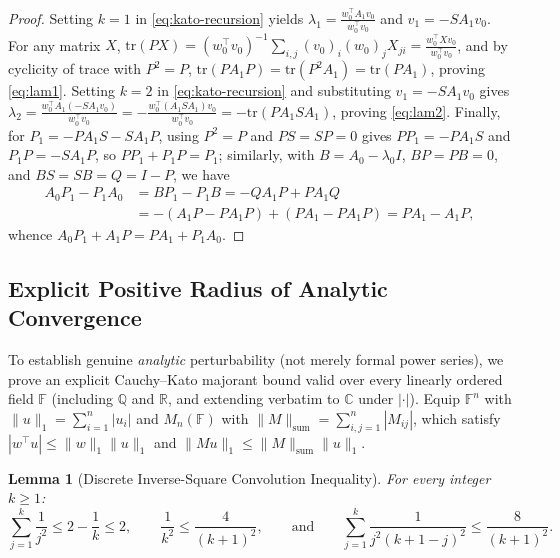 \documentclass[11pt,a4paper]{article}
\newtheorem{lemma}[theorem]{Lemma}
\theoremstyle{definition}
\newcommand{\tr}{\mathrm{tr}}
\begin{document}
\begin{proof}
Setting $k = 1$ in \eqref{eq:kato-recursion} yields $\lambda_1 =
\frac{w_0^\top A_1 v_0}{w_0^\top v_0}$ and $v_1 = - S A_1 v_0$. For any matrix $X$,
$\tr(P X) = (w_0^\top v_0)^{-1} \sum_{i,j} (v_0)_i (w_0)_j X_{ji} =
\frac{w_0^\top X v_0}{w_0^\top v_0}$, and by cyclicity of trace with $P^2 = P$,
$\tr(P A_1 P) = \tr(P^2 A_1) = \tr(P A_1)$, proving \eqref{eq:lam1}. Setting $k = 2$ in
\eqref{eq:kato-recursion} and substituting $v_1 = - S A_1 v_0$ gives
$\lambda_2 = \frac{w_0^\top A_1 (- S A_1 v_0)}{w_0^\top v_0} =
-\frac{w_0^\top (A_1 S A_1) v_0}{w_0^\top v_0} = -\tr(P A_1 S A_1)$, proving
\eqref{eq:lam2}. Finally, for $P_1 = - P A_1 S - S A_1 P$, using $P^2 = P$ and
$P S = S P = 0$ gives $P P_1 = - P A_1 S$ and $P_1 P = - S A_1 P$, so $P P_1 + P_1 P =
P_1$; similarly, with $B = A_0 - \lambda_0 I$, $B P = P B = 0$, and $B S = S B = Q =
I - P$, we have
\begin{align*}
  A_0 P_1 - P_1 A_0 &= B P_1 - P_1 B = - Q A_1 P + P A_1 Q \\
  &= -(A_1 P - P A_1 P) + (P A_1 - P A_1 P) = P A_1 - A_1 P,
\end{align*}
whence $A_0 P_1 + A_1 P = P A_1 + P_1 A_0$.
\end{proof}

\subsection{Explicit Positive Radius of Analytic Convergence}

To establish genuine \emph{analytic} perturbability (not merely formal power series), we
prove an explicit Cauchy--Kato majorant bound valid over every linearly ordered field
$\mathbb{F}$ (including $\mathbb{Q}$ and $\mathbb{R}$, and extending verbatim to
$\mathbb{C}$ under $|\cdot|$). Equip $\mathbb{F}^n$ with $\|u\|_1 = \sum_{i=1}^n |u_i|$
and $M_n(\mathbb{F})$ with $\|M\|_{\mathrm{sum}} = \sum_{i,j=1}^n |M_{ij}|$, which
satisfy $|w^\top u| \le \|w\|_1 \|u\|_1$ and $\|M u\|_1 \le \|M\|_{\mathrm{sum}} \|u\|_1$.

\begin{lemma}[Discrete Inverse-Square Convolution Inequality]\label{lem:inv-sq}
For every integer $k \ge 1$:
\[
  \sum_{j=1}^k \frac{1}{j^2} \le 2 - \frac{1}{k} \le 2,
  \qquad
  \frac{1}{k^2} \le \frac{4}{(k + 1)^2},
  \qquad\text{and}\qquad
  \sum_{j=1}^k \frac{1}{j^2 (k + 1 - j)^2} \le \frac{8}{(k + 1)^2}.
\]
\end{lemma}
\end{document}
